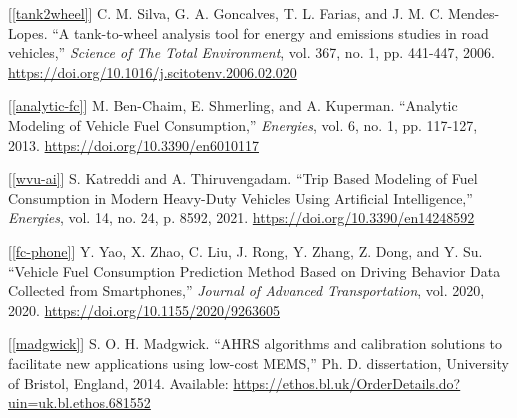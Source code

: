 \documentclass[11pt, oneside]{article}
\newcommand{\refinit}[1]{\noindent \hangindent=0.6cm [\ref*{#1}]}  %
\begin{document}
\begin{footnotesize}
\refinit{tank2wheel} C. M. Silva, G. A. Goncalves, T. L. Farias, and J. M. C. Mendes-Lopes. ``A tank-to-wheel analysis tool for energy and emissions studies in road vehicles,'' \textit{Science of The Total Environment}, vol. 367, no. 1, pp. 441-447, 2006. \url{https://doi.org/10.1016/j.scitotenv.2006.02.020}

\refinit{analytic-fc} M. Ben-Chaim, E. Shmerling, and A. Kuperman. ``Analytic Modeling of Vehicle Fuel Consumption,'' \textit{Energies}, vol. 6, no. 1, pp. 117-127, 2013. \url{https://doi.org/10.3390/en6010117}

\refinit{wvu-ai} S. Katreddi and A. Thiruvengadam. ``Trip Based Modeling of Fuel Consumption in Modern Heavy-Duty Vehicles Using Artificial Intelligence,'' \textit{Energies}, vol. 14, no. 24, p. 8592, 2021. \url{https://doi.org/10.3390/en14248592}

\refinit{fc-phone} Y. Yao, X. Zhao, C. Liu, J. Rong, Y. Zhang, Z. Dong, and Y. Su. ``Vehicle Fuel Consumption Prediction Method Based on Driving Behavior Data Collected from Smartphones,'' \textit{Journal of Advanced Transportation}, vol. 2020, 2020. \url{https://doi.org/10.1155/2020/9263605}

\refinit{madgwick} S. O. H. Madgwick. ``AHRS algorithms and calibration solutions to facilitate new applications using low-cost MEMS,'' Ph. D. dissertation, University of Bristol, England, 2014. Available: \url{https://ethos.bl.uk/OrderDetails.do?uin=uk.bl.ethos.681552}

\end{footnotesize}
\end{document}
